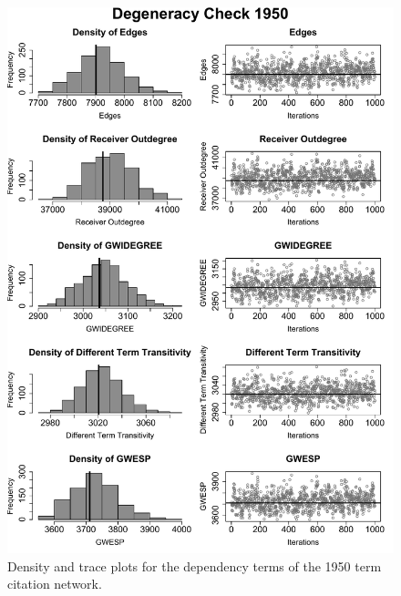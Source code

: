 \documentclass{cup-pan}
\begin{document}
\begin{figure}[bt]
 \begin{center}
\includegraphics[width=1\textwidth]{Deg_1950}
\caption{Density and trace plots for the dependency terms of the 1950 term citation network.}
 \label{mcmcdiagnostics_1950}
\vspace{-.25cm}
\end{center}
\end{figure} 
\end{document}
